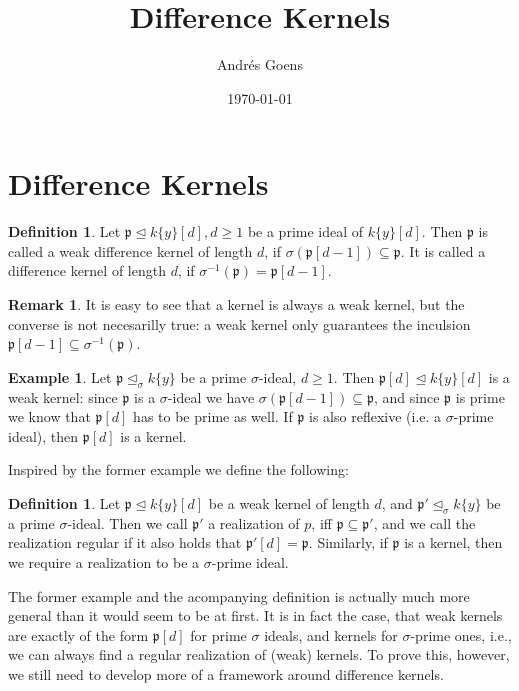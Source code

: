 \documentclass{article}
\title{Difference Kernels}
\author{Andr\'{e}s Goens}
\date{\today}
\def\p{\mathfrak{p}}
\def\s{\sigma}
\def\si{\unlhd_{\sigma}}
\theoremstyle{definition}
\newtheorem{theorem}[Satz]{Theorem}
\newtheorem{ex}[Satz]{Example}
\newtheorem{rem}[Satz]{Remark}
\newtheorem{defn}[Satz]{Definition}
\begin{document}
\section{Difference Kernels}



\begin{defn}
Let $\p \unlhd k\{y\}[d], d \geq 1$ be a prime ideal of $k\{y\}[d]$. Then $\p$ is called a weak difference kernel of length $d$, if $\s(\p[d-1]) \subseteq \p$. It is called a difference kernel of length $d$, if $\s^{-1}(\p) = \p[d-1]$.
\end{defn}

\begin{rem}
It is easy to see that a kernel is always a weak kernel, but the converse is not necesarilly true: a weak kernel only guarantees the inculsion $\p[d-1] \subseteq \s^{-1}(\p)$.
\end{rem}

\begin{ex}
Let $\p \si k\{y\}$ be a prime $\s$-ideal, $d \geq 1$. Then $\p[d] \unlhd k\{y\}[d]$ is a weak kernel: since $\p$ is a $\s$-ideal we have $\s(\p[d-1]) \subseteq \p$, 
and since $\p$ is prime we know that $\p[d]$ has to be prime as well. If $\p$ is also reflexive (i.e. a $\s$-prime ideal), then $\p[d]$ is a kernel. 
\end{ex}

Inspired by the former example we define the following:
\begin{defn}
Let $\p \unlhd k\{y\}[d]$ be a weak kernel of length $d$, and $\p' \si k\{y\}$ be a prime $\s$-ideal. Then we call $\p'$ a realization of $p$, iff $\p \subseteq \p'$, 
and we call the realization regular if it also holds that $\p'[d] = \p$. Similarly, if $\p$ is a kernel, then we require a realization to be a $\s$-prime ideal.
\end{defn}

The former example and the acompanying definition is actually much more general than it would seem to be at first. 
It is in fact the case, that weak kernels are exactly of the form $\p[d]$ for prime $\s$ ideals,
and kernels for $\s$-prime ones, i.e., we can always find a regular realization of (weak) kernels. 
To prove this, however, we still need to develop more of a framework around difference kernels.
\end{document}
